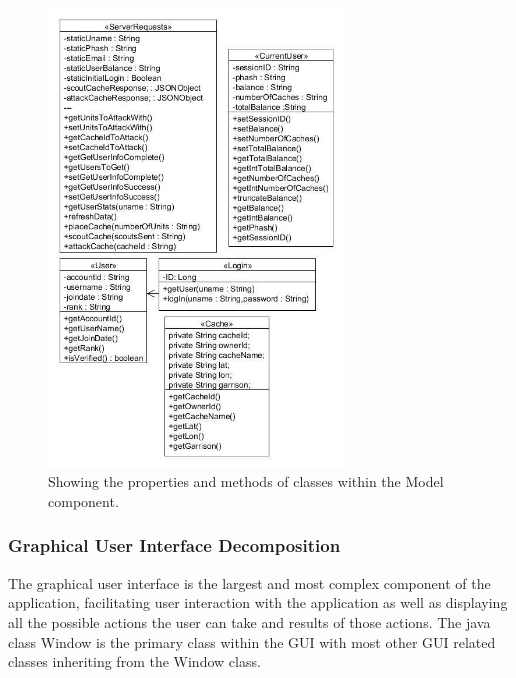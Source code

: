 \begin{figure}[h!]
    \centering
    \includegraphics[width=0.7\textwidth]{imdfig3}
    \caption{Showing the properties and methods of classes within the Model component.}
\end{figure}

\subsubsection{Graphical User Interface Decomposition}
The graphical user interface is the largest and most complex component of the application, facilitating user interaction with the application as well as displaying all the possible actions the user can take and results of those actions. The java class Window is the primary class within the GUI with most other GUI related classes inheriting from the Window class.

